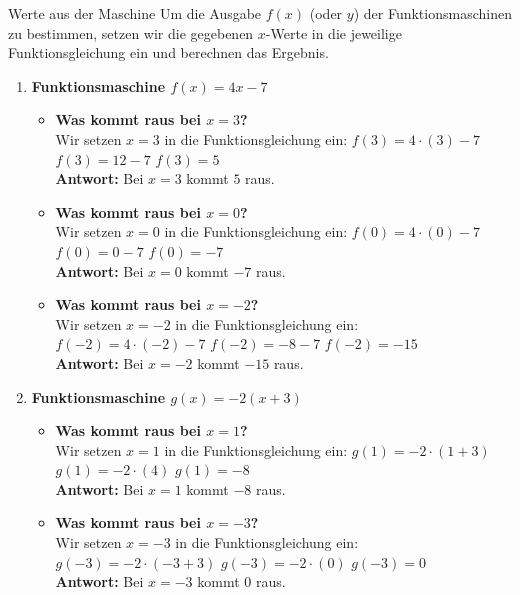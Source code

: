 \begin{loesungsumgebung}{Werte aus der Maschine}
Um die Ausgabe $f(x)$ (oder $y$) der Funktionsmaschinen zu bestimmen, setzen wir die gegebenen $x$-Werte in die jeweilige Funktionsgleichung ein und berechnen das Ergebnis.

\begin{enumerate}
    \item \textbf{Funktionsmaschine $f(x) = 4x - 7$}
    \begin{itemize}
        \item \textbf{Was kommt raus bei $x=3$?} \\
        Wir setzen $x=3$ in die Funktionsgleichung ein:
        $f(3) = 4 \cdot (3) - 7$
        $f(3) = 12 - 7$
        $f(3) = 5$ \\
        \textbf{Antwort:} Bei $x=3$ kommt $5$ raus.

        \item \textbf{Was kommt raus bei $x=0$?} \\
        Wir setzen $x=0$ in die Funktionsgleichung ein:
        $f(0) = 4 \cdot (0) - 7$
        $f(0) = 0 - 7$
        $f(0) = -7$ \\
        \textbf{Antwort:} Bei $x=0$ kommt $-7$ raus.

        \item \textbf{Was kommt raus bei $x=-2$?} \\
        Wir setzen $x=-2$ in die Funktionsgleichung ein:
        $f(-2) = 4 \cdot (-2) - 7$
        $f(-2) = -8 - 7$
        $f(-2) = -15$ \\
        \textbf{Antwort:} Bei $x=-2$ kommt $-15$ raus.
    \end{itemize}

    \item \textbf{Funktionsmaschine $g(x) = -2(x+3)$}
    \begin{itemize}
        \item \textbf{Was kommt raus bei $x=1$?} \\
        Wir setzen $x=1$ in die Funktionsgleichung ein:
        $g(1) = -2 \cdot (1+3)$
        $g(1) = -2 \cdot (4)$
        $g(1) = -8$ \\
        \textbf{Antwort:} Bei $x=1$ kommt $-8$ raus.

        \item \textbf{Was kommt raus bei $x=-3$?} \\
        Wir setzen $x=-3$ in die Funktionsgleichung ein:
        $g(-3) = -2 \cdot (-3+3)$
        $g(-3) = -2 \cdot (0)$
        $g(-3) = 0$ \\
        \textbf{Antwort:} Bei $x=-3$ kommt $0$ raus.


\end{itemize}
\end{enumerate}
\end{loesungsumgebung}
